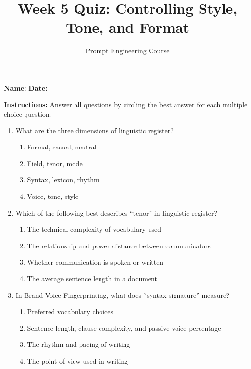 \documentclass[11pt]{article}
\title{Week 5 Quiz: Controlling Style, Tone, and Format}
\author{Prompt Engineering Course}
\date{}
\begin{document}
\maketitle

\noindent \textbf{Name:} \underline{\hspace{8cm}} \hspace{1cm} \textbf{Date:} \underline{\hspace{3cm}}

\vspace{0.5cm}
\noindent \textbf{Instructions:} Answer all questions by circling the best answer for each multiple choice question.

\vspace{0.5cm}

\begin{enumerate}

\item What are the three dimensions of linguistic register?
\begin{enumerate}[label=\Alph*.]
    \item Formal, casual, neutral
    \item Field, tenor, mode
    \item Syntax, lexicon, rhythm
    \item Voice, tone, style
\end{enumerate}

\item Which of the following best describes ``tenor'' in linguistic register?
\begin{enumerate}[label=\Alph*.]
    \item The technical complexity of vocabulary used
    \item The relationship and power distance between communicators
    \item Whether communication is spoken or written
    \item The average sentence length in a document
\end{enumerate}

\item In Brand Voice Fingerprinting, what does ``syntax signature'' measure?
\begin{enumerate}[label=\Alph*.]
    \item Preferred vocabulary choices
    \item Sentence length, clause complexity, and passive voice percentage
    \item The rhythm and pacing of writing
    \item The point of view used in writing
\end{enumerate}


\end{enumerate}
\end{document}
